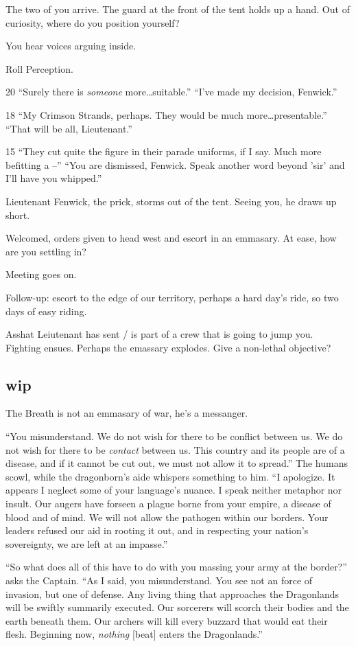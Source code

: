 \begin{multicols}{2}
The two of you arrive.
The guard at the front of the tent holds up a hand.
Out of curiosity, where do you position yourself?

You hear voices arguing inside.

Roll Perception.

20
``Surely there is \emph{someone} more\dots suitable.''
``I've made my decision, Fenwick.''

18
``My Crimson Strands, perhaps.
  They would be much more\dots presentable.''
``That will be all, Lieutenant.''

15
``They cut quite the figure in their parade uniforms, if I say.
  Much more befitting a --''
``You are dismissed, Fenwick.
  Speak another word beyond 'sir' and I'll have you whipped.''

Lieutenant Fenwick, the prick, storms out of the tent.
Seeing you, he draws up short.

Welcomed, orders given to head west and escort in an emmasary.
At ease, how are you settling in?

Meeting goes on.

Follow-up: escort to the edge of our territory, perhaps a hard day's ride, so two days of easy
  riding.

Asshat Leiutenant has sent / is part of a crew that is going to jump you.
Fighting ensues.
Perhaps the emassary explodes.
Give a non-lethal objective?
\subsection{wip}

The Breath is not an emmasary of war, he's a messanger.

  \begin{aloud}
  ``You misunderstand.
    We do not wish for there to be conflict between us.
    We do not wish for there to be \emph{contact} between us.
    This country and its people are of a disease,
      and if it cannot be cut out, we must not allow it to spread.''
    The humans scowl, while the dragonborn's aide whispers something to him.
  ``I apologize.
    It appears I neglect some of your language's nuance.
    I speak neither metaphor nor insult.
    Our augers have forseen a plague borne from your empire, a disease of blood and of mind.
    We will not allow the pathogen within our borders.
    Your leaders refused our aid in rooting it out, and in respecting your nation's sovereignty,
      we are left at an impasse.''

  ``So what does all of this have to do with you massing your army at the border?''
     asks the Captain.
  ``As I said, you misunderstand.
    You see not an force of invasion, but one of defense.
    Any living thing that approaches the Dragonlands will be swiftly summarily executed.
    Our sorcerers will scorch their bodies and the earth beneath them.
    Our archers will kill every buzzard that would eat their flesh.
    Beginning now, \emph{nothing} [beat] enters the Dragonlands.''


\end{aloud}
\end{multicols}
